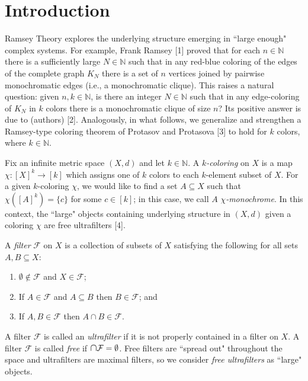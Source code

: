\section{Introduction}
Ramsey Theory explores the underlying structure emerging in ``large enough" complex systems. For example, Frank Ramsey [1] proved that for each \( n \in \mathbb{N}  \) there is a sufficiently large \( N \in \mathbb{N}  \) such that in any red-blue coloring of the edges of the complete graph \( K_{N} \) there is a set of \( n \) vertices joined by pairwise monochromatic edges (i.e., a monochromatic clique).  This raises a natural question: given \( n, k \in \mathbb{N}  \), is there an integer \( N \in \mathbb{N} \) such that in any edge-coloring of \( K_{N}  \) in \( k \) colors there is a monochromatic clique of size \( n \)? Its positive answer is due to (authors) [2]. Analogously, in what follows, we generalize and strengthen a Ramsey-type coloring theorem of Protasov and Protasova [3] to hold for $k$ colors, where \( k \in \mathbb{N}  \).

Fix an infinite metric space \( (X,d) \) and let \( k \in \mathbb{N}  \). A \emph{\( k \)-coloring} on \( X \) is a map \( \chi : [X]^{k} \to [k]  \) which assigns one of \( k \) colors to each \( k \)-element subset of \( X \). For a given \( k \)-coloring \( \chi \), we would like to find a set \( A \subseteq X \) such that \( \chi ([A]^{k}) = \{ c \}  \) for some \( c \in [k] \); in this case, we call \( A \) \emph{\( \chi \)-monochrome}. In this context, the ``large" objects containing underlying structure in \( (X,d) \) given a coloring \( \chi \) are free ultrafilters [4].

A \emph{filter} \( \mathcal{F}  \) on \( X \) is a collection of subsets of \( X \) satisfying the following for all sets \( A, B \subseteq X \):
\begin{enumerate}[leftmargin=1.2cm]
	\item \( \emptyset  \notin \mathcal{F}  \) and \( X \in \mathcal{F}  \);
	\item If \( A \in \mathcal{F} \) and \( A \subseteq B \) then \( B \in \mathcal{F}  \); and
	\item If \( A, B \in \mathcal{F}  \) then \( A \cap B \in \mathcal{F}  \).
\end{enumerate}
A filter \( \mathcal{F}  \) is called an \emph{ultrafilter} if it is not properly contained in a filter on \( X \). A filter \( \mathcal{F}  \) is called \emph{free} if \( \medcap \mathcal{F} = \emptyset  \). Free filters are ``spread out" throughout the space and ultrafilters are maximal filters, so we consider \emph{free ultrafilters} as ``large" objects.



\begin{comment}
	A mapping \( \chi : [X]^{k} \to [k]  \) is called an \emph{isometric coloring} if \( \chi (A_1) = \chi (A_2) \) whenever \( A_1, A_2 \) is a pair of isodiametric \( k \)-element subsets of \( X \).
\end{comment}
